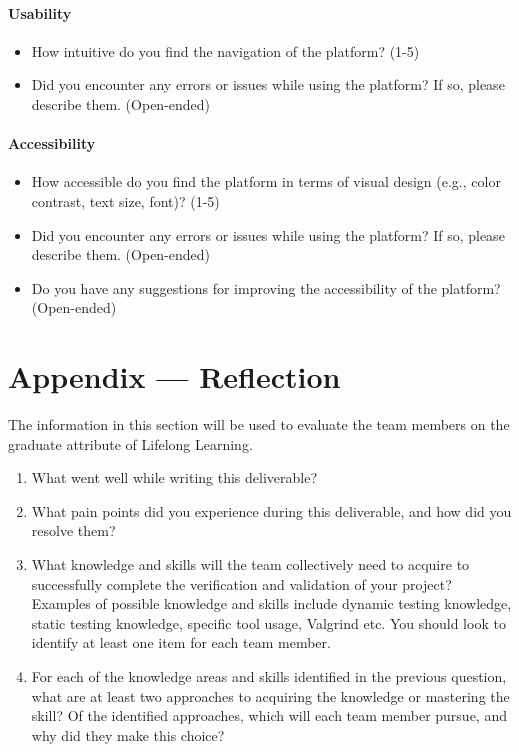 \documentclass[12pt, titlepage]{article}
\begin{document}
\paragraph{Usability}
\begin{itemize}
  \item{How intuitive do you find the navigation of the platform? (1-5)}
  \item{Did you encounter any errors or issues while using the platform? If so, please describe them. (Open-ended)}
\end{itemize}


\paragraph{Accessibility}
\begin{itemize}
  \item{How accessible do you find the platform in terms of visual design (e.g., color contrast, text size, font)? (1-5)}
  \item{Did you encounter any errors or issues while using the platform? If so, please describe them. (Open-ended)}
  \item{Do you have any suggestions for improving the accessibility of the platform?
        (Open-ended)}
\end{itemize}

\newpage{}
\section*{Appendix --- Reflection}


The information in this section will be used to evaluate the team members on the
graduate attribute of Lifelong Learning.



\begin{enumerate}
  \item What went well while writing this deliverable?
  \item What pain points did you experience during this deliverable, and how
        did you resolve them?
  \item What knowledge and skills will the team collectively need to acquire to
        successfully complete the verification and validation of your project?
        Examples of possible knowledge and skills include dynamic testing knowledge,
        static testing knowledge, specific tool usage, Valgrind etc.  You should look to
        identify at least one item for each team member.
  \item For each of the knowledge areas and skills identified in the previous
        question, what are at least two approaches to acquiring the knowledge or
        mastering the skill?  Of the identified approaches, which will each team
        member pursue, and why did they make this choice?
\end{enumerate}
\end{document}
